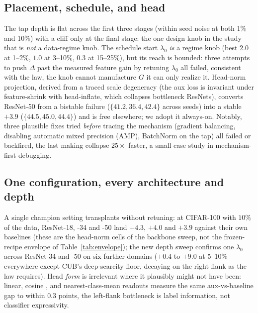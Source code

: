 \subsection{Placement, schedule, and head}\label{abl:placement}
The tap depth is flat across the first three stages (within seed noise at
both 1\% and 10\%) with a cliff only at the final stage: the one design
knob in the study that is \emph{not} a data-regime knob. The schedule
start $\lambda_0$ \emph{is} a regime knob (best $2.0$ at 1--2\%, $1.0$ at
3--10\%, $0.3$ at 15--25\%), but its reach is bounded: three attempts to
push $\Delta$ past the measured feature gain by retuning $\lambda_0$ all
failed, consistent with the law, the knob cannot manufacture $G$ it can
only realize it. Head-norm projection, derived from a traced scale
degeneracy (the aux loss is invariant under feature-shrink with head-inflate,
which collapses bottleneck ResNets), converts ResNet-50 from a bistable
failure ($\{41.2, 36.4, 42.4\}$ across seeds) into a stable $+3.9$
($\{44.5, 45.0, 44.4\}$) and is free elsewhere; we adopt it always-on.
Notably, three plausible fixes tried \emph{before} tracing the mechanism
(gradient balancing, disabling automatic mixed precision (AMP), BatchNorm on the tap) all failed or
backfired, the last making collapse $25\times$ faster, a small case
study in mechanism-first debugging.

\subsection{One configuration, every architecture and depth}\label{abl:universal}
A single champion setting transplants without retuning: at CIFAR-100 with
$10\%$ of the data, ResNet-18, -34 and -50 land $+4.3$, $+4.0$ and $+3.9$
against their own baselines (these are the head-norm cells of the
backbone sweep, not the frozen-recipe envelope of
Table~\ref{tab:envelope}); the new depth
sweep confirms one $\lambda_0$ across ResNet-34 and -50 on six further
domains ($+0.4$ to $+9.0$
at 5--10\% everywhere except CUB's deep-scarcity floor, decaying on the
right flank as the law requires). Head \emph{form} is irrelevant where it
plausibly might not have been: linear, cosine
, and nearest-class-mean
readouts measure the same aux-vs-baseline gap to within $0.3$ points,
the left-flank bottleneck is label information, not classifier
expressivity.

